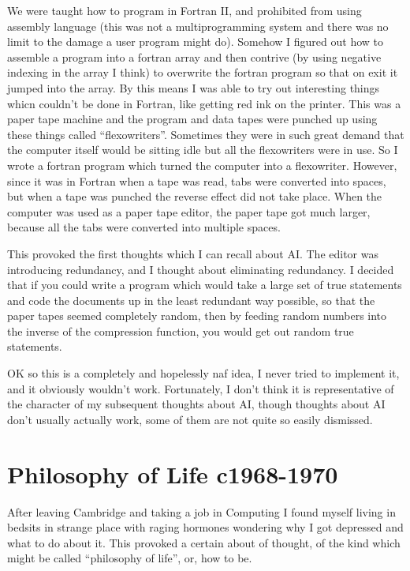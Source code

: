 \documentclass[10pt,titlepage]{book}
\begin{document}
We were taught how to program in Fortran II, and prohibited from using assembly language (this was not a multiprogramming system and there was no limit to the damage a user program might do).
Somehow I figured out how to assemble a program into a fortran array and then contrive (by using negative indexing in the array I think) to overwrite the fortran program so that on exit it jumped into the array.
By this means I was able to try out interesting things whicn couldn't be done in Fortran, like getting red ink on the printer.
This was a paper tape machine and the program and data tapes were punched up using these things called ``flexowriters''.
Sometimes they were in such great demand that the computer itself would be sitting idle but all the flexowriters were in use.
So I wrote a fortran program which turned the computer into a flexowriter.
However, since it was in Fortran when a tape was read, tabs were converted into spaces, but when a tape was punched the reverse effect did not take place.
When the computer was used as a paper tape editor, the paper tape got much larger, because all the tabs were converted into multiple spaces.

This provoked the first thoughts which I can recall about AI.
The editor was introducing redundancy, and I thought about eliminating redundancy.
I decided that if you could write a program which would take a large set of true statements and code the documents up in the least redundant way possible, so that the paper tapes seemed completely random, then by feeding random numbers into the inverse of the compression function, you would get out random true statements.

OK so this is a completely and hopelessly naf idea, I never tried to implement it, and it obviously wouldn't work.
Fortunately, I don't think it is representative of the character of my subsequent thoughts about AI, though thoughts about AI don't usually actually work, some of them are not quite so easily dismissed.

\section{Philosophy of Life c1968-1970}

After leaving Cambridge and taking a job in Computing I found myself living in bedsits in strange place with raging hormones wondering why I got depressed and what to do about it.
This provoked a certain about of thought, of the kind which might be called ``philosophy of life'', or, how to be.
\end{document}
